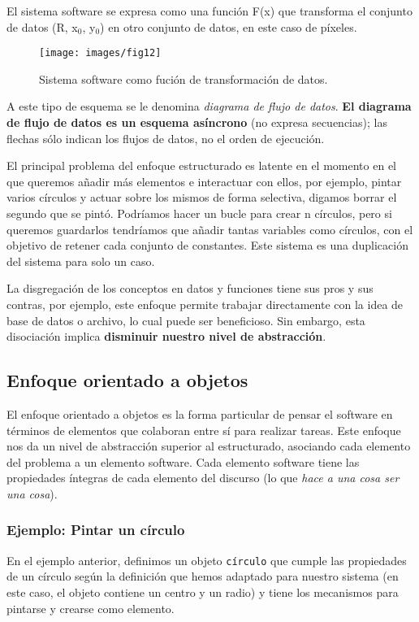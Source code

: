 El sistema software se expresa como una función F(x) que transforma el
conjunto de datos (R, x\(_{\text{0}}\), y\(_{\text{0}}\)) en otro
conjunto de datos, en este caso de píxeles.

\begin{figure}[ht!]  \centering
  \texttt{[image: images/fig12]}
  \caption{Sistema software como fución de transformación de datos.}
  \label{fig:12}
\end{figure}

A este tipo de esquema se le denomina \emph{diagrama de flujo de
  datos}. \textbf{El diagrama de flujo de datos es un esquema asíncrono}
(no expresa secuencias); las flechas sólo indican los flujos de datos,
no el orden de ejecución.

\vspace{5mm}

El principal problema del enfoque estructurado es latente en el
momento en el que queremos añadir más elementos e interactuar con
ellos, por ejemplo, pintar varios círculos y actuar sobre los mismos
de forma selectiva, digamos borrar el segundo que se pintó.  Podríamos
hacer un bucle para crear n círculos, pero si queremos guardarlos
tendríamos que añadir tantas variables como círculos, con el objetivo
de retener cada conjunto de constantes. Este sistema es una
duplicación del sistema para solo un caso.

\vspace{5mm}

La disgregación de los conceptos en datos y funciones tiene sus pros y
sus contras, por ejemplo, este enfoque permite trabajar directamente
con la idea de base de datos o archivo, lo cual puede ser
beneficioso. Sin embargo, esta disociación implica \textbf{disminuir
  nuestro nivel de abstracción}.
\subsection{Enfoque orientado a objetos}
\label{sec:orgab1dc13} El enfoque orientado a objetos es la forma
particular de pensar el software en términos de elementos que
colaboran entre sí para realizar tareas.  Este enfoque nos da un nivel
de abstracción superior al estructurado, asociando cada elemento del
problema a un elemento software.  Cada elemento software tiene las
propiedades íntegras de cada elemento del discurso (lo que \emph{hace
  a una cosa ser una cosa}).
\subsubsection{Ejemplo: Pintar un círculo}
\label{sec:orge1a8962} En el ejemplo anterior, definimos un objeto
\texttt{círculo} que cumple las propiedades de un círculo según la
definición que hemos adaptado para nuestro sistema (en este caso, el
objeto contiene un centro y un radio) y tiene los mecanismos para
pintarse y crearse como elemento.

